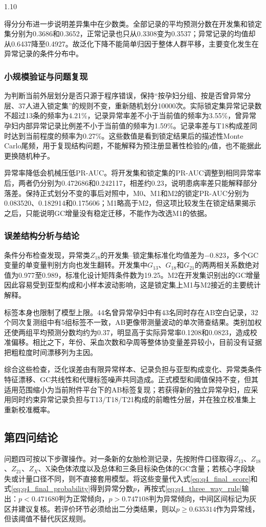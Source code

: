 \documentclass[12pt,a4paper]{ctexrep}
\numberwithin{equation}{section}
\begin{document}
\begin{spacing}{1.10}
{			得分分布进一步说明差异集中在少数类。全部记录的平均预测分数在开发集和锁定集分别为0.3686和0.3652，正常记录也只从0.3308变为0.3537；异常记录的均值却从0.6437降至0.4927。故泛化下降不能简单归因于整体人群平移，主要变化发生在异常记录的条件分布中。

			\subsubsection{小规模验证与问题复现}
			为判断当前外层划分是否只源于程序错误，保持“按孕妇分组、按是否曾异常分层、37人进入锁定集”的规则不变，重新随机划分10000次。实际锁定集异常记录数不超过13条的频率为4.21\%，记录异常率差不小于当前值的频率为3.55\%，曾异常孕妇内部异常记录比例差不小于当前值的频率为1.59\%。记录率差与T18构成差同时达到当前程度的频率为0.27\%。这些数值是看到锁定结果后的描述性Monte Carlo尾频，用于复现结构问题，不能解释为预注册显著性检验的$p$值，也不能据此更换随机种子。

			异常率降低会机械压低PR-AUC。将开发集和锁定集的PR-AUC调整到相同异常率后，两者仍分别为0.472686和0.242117，相差约0.23，说明患病率差只能解释部分落差。保持正式划分不变的事后对照中，M0、M1和M2的锁定PR-AUC分别为0.083520、0.182914和0.175606；M1略高于M2，但这项比较发生在锁定结果揭示之后，只能说明GC增量没有稳定迁移，不能作为改选M1的依据。

			\subsubsection{误差结构分析与结论}
			条件分布检查发现，异常类$Z_{18}$的开发集--锁定集标准化均值差为$-0.823$，多个GC变量的单变量判别方向也发生翻转。开发集中$G_{13}$、$G_{18}$和$G_{21}$的两两相关系数绝对值为0.977至0.989，标准化设计矩阵条件数为19.25。M2在开发集识别出的GC增量因此容易受到亚型构成和小样本波动影响，这是锁定集上M1与M2接近的主要统计解释。

			标签本身也限制了模型上限。44名曾异常孕妇中有43名同时存在AB空白记录，32个同次复测组中有5组标签不一致，AB更像带测量波动的单次筛查结果。类别加权还使两组平均预测分数均约为0.37，明显高于实际异常率0.1208和0.0823，造成校准偏移。相比之下，年份、采血次数和孕周等整体协变量差异较小，目前没有证据把粗粒度时间漂移列为主因。

			综合这些检查，泛化误差由有限异常样本、记录负担与亚型构成变化、异常类条件特征漂移、GC共线性和代理标签噪声共同造成。正式模型和阈值保持不变，但其适用范围缩小为当前附件平台下的AB标签复现；若获得新的独立异常孕妇，应采用同时约束异常记录负担与T13/T18/T21构成的前瞻性分层，并在独立校准集上重新校准概率。
			
			\subsection{第四问结论}
			问题四可按以下步骤操作。对一条新的女胎检测记录，先按附件口径取得$Z_{13}$、$Z_{18}$、$Z_{21}$、$Z_X$、X染色体浓度以及总体和三条目标染色体的GC含量；若核心字段缺失或计量口径不同，则不直接套用模型。将这些变量代入式\eqref{eq:q4_final_score}和式\eqref{eq:q4_final_probability}得到异常分数$p$，再按式\eqref{eq:q4_three_way_rule}输出：$p<0.471680$判为正常倾向，$p>0.747108$判为异常倾向，中间区间标记为灰区并建议复核。若评价环节必须给出二分类结果，则以$p\ge0.635314$作为异常线，但该阈值不替代灰区规则。

}
\end{spacing}
\end{document}
